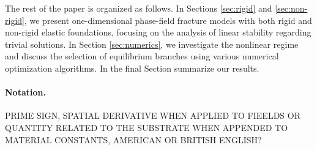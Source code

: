 The rest of the paper is organized as follows. In Sections \ref{sec:rigid} and \ref{sec:non-rigid}, we present one-dimensional phase-field fracture models with both rigid and non-rigid elastic foundations, focusing on the analysis  of linear stability regarding trivial solutions. In Section \ref{sec:numerics}, we investigate the nonlinear regime and discuss the selection of equilibrium branches using various numerical optimization algorithms. In the final Section  summarize our results.

\paragraph{Notation.} 
PRIME SIGN, SPATIAL DERIVATIVE WHEN APPLIED TO FIEELDS OR QUANTITY RELATED TO THE SUBSTRATE WHEN APPENDED TO MATERIAL CONSTANTS,
AMERICAN  OR BRITISH ENGLISH?